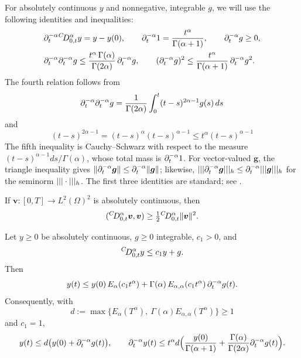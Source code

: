For absolutely continuous $y$ and nonnegative, integrable $g$, we will use the following identities and inequalities:
\begin{equation}\label{eq:rl}
\begin{aligned}
&\partial_t^{-\alpha}{}^{C}\!D_{0,t}^{\alpha} y=y-y(0),\qquad \partial_t^{-\alpha}1=\frac{t^\alpha}{\Gamma(\alpha+1)},\qquad \partial_t^{-\alpha} g\ge0,\\
&\partial_t^{-\alpha}\partial_t^{-\alpha} g\le\frac{t^\alpha\,\Gamma(\alpha)}{\Gamma(2\alpha)}\,\partial_t^{-\alpha} g,\qquad(\partial_t^{-\alpha} g)^2\le\frac{t^\alpha}{\Gamma(\alpha+1)}\,\partial_t^{-\alpha} g^2 .
\end{aligned}
\end{equation}
The fourth relation follows from 
$$\partial_t^{-\alpha}\partial_t^{-\alpha} g=\frac1{\Gamma(2\alpha)}\int_0^t(t-s)^{2\alpha-1}g(s)\,ds$$ 
and $$(t-s)^{2\alpha-1}=(t-s)^\alpha(t-s)^{\alpha-1}\le t^\alpha(t-s)^{\alpha-1}$$
The fifth inequality is Cauchy--Schwarz with respect to the measure $(t-s)^{\alpha-1}ds/\Gamma(\alpha)$, whose total mass is $\partial_t^{-\alpha}1$. For vector-valued $\bm g$, the triangle inequality gives $\|\partial_t^{-\alpha}\bm g\|\le\partial_t^{-\alpha}\|\bm g\|$; likewise, $|||\partial_t^{-\alpha}\bm g|||_h\le\partial_t^{-\alpha}|||\bm g|||_h$ for the seminorm $|||\cdot|||_h$. The first three identities are standard; see \cite[Ch.\ 2--3]{Die10}.

\begin{lemma}\label{lem:posc}
If $\bm v:[0,T]\to L^2(\Omega)^2$ is absolutely continuous, then
\[
({}^{C}\!D_{0,t}^{\alpha}\bm v,\bm v)\ge\tfrac12{}^{C}\!D_{0,t}^{\alpha}\|\bm v\|^2 .
\]
\end{lemma}

\begin{lemma}\label{lem:gronwall}
Let $y\ge0$ be absolutely continuous, $g\ge0$ integrable, $c_1>0$, and
\[
{}^{C}\!D_{0,t}^{\alpha} y\le c_1y+g .
\]
Then
\[
y(t)\le y(0)\,E_\alpha(c_1t^\alpha)+\Gamma(\alpha)\,E_{\alpha,\alpha}(c_1t^\alpha)\,\partial_t^{-\alpha} g(t).
\]
Consequently, with
\[
d:=\max\bigl\{E_\alpha(T^\alpha),\ \Gamma(\alpha)E_{\alpha,\alpha}(T^\alpha)\bigr\}\ge1
\]
and $c_1=1$,
\[
y(t)\le d\bigl(y(0)+\partial_t^{-\alpha} g(t)\bigr),\qquad
\partial_t^{-\alpha} y(t)\le t^\alpha d\Bigl(\frac{y(0)}{\Gamma(\alpha+1)}+\frac{\Gamma(\alpha)}{\Gamma(2\alpha)}\partial_t^{-\alpha} g(t)\Bigr).
\]
\end{lemma}

